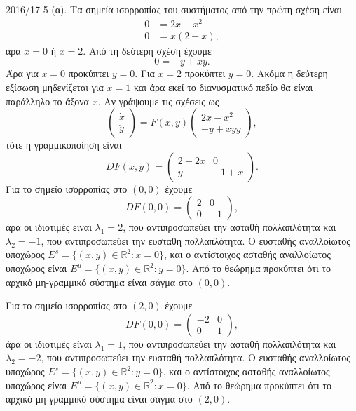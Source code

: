 \begin{solution}{2016/17 5}
    (α). Τα σημεία ισορροπίας του συστήματος από την πρώτη σχέση είναι
    \begin{align*}
        0 &= 2x - x^2 \\
        0 &= x(2- x),
    \end{align*}
    άρα \( x = 0 \) ή \( x = 2 \). Από τη δεύτερη σχέση έχουμε
    \[
        0 = -y + xy.
    \]
    Άρα για \( x = 0 \) προκύπτει \( y = 0 \). Για \( x = 2 \) προκύπτει \( y =
    0 \). Ακόμα η δεύτερη εξίσωση μηδενίζεται για \( x = 1 \) και άρα εκεί το
    διανυσματικό πεδίο θα είναι παράλληλο το άξονα \( x \). Αν γράψουμε τις
    σχέσεις ως
    \[
        \begin{pmatrix}
            \dot{x} \\
            \dot{y}
        \end{pmatrix} = F(x, y)
        \begin{pmatrix}
            2x - x^2 \\
            -y + xy
            \dot{y}
        \end{pmatrix},
    \]
    τότε η γραμμικοποίηση είναι
    \[
        DF(x, y) =
        \begin{pmatrix}
            2 - 2x & 0 \\
            y & -1 + x
        \end{pmatrix}.
    \]
    Για το σημείο ισορροπίας στο \( (0, 0) \) έχουμε
    \[
        DF(0, 0) =
        \begin{pmatrix}
            2 & 0 \\
            0 & -1
        \end{pmatrix},
    \]
    άρα οι ιδιοτιμές είναι \( \lambda_1 = 2 \), που αντιπροσωπεύει την ασταθή πολλαπλότητα
    και \( \lambda_2 = -1 \), που αντιπροσωπεύει την ευσταθή πολλαπλότητα. Ο ευσταθής
    αναλλοίωτος υποχώρος \( E^s = \{ (x, y)\in \mathbb{R}^2: x = 0 \} \), και ο αντίστοιχος
    ασταθής αναλλοίωτος υποχώρος είναι \( E^u = \{ (x, y)\in \mathbb{R}^2: y = 0 \} \).
    Από το θεώρημα  προκύπτει ότι το αρχικό μη-γραμμικό σύστημα είναι σάγμα
    στο \( (0, 0) \).

    Για το σημείο ισορροπίας στο \( (2, 0) \) έχουμε
    \[
        DF(0, 0) =
        \begin{pmatrix}
            -2 & 0 \\
            0 & 1
        \end{pmatrix},
    \]
    άρα οι ιδιοτιμές είναι \( \lambda_1 = 1 \), που αντιπροσωπεύει την ασταθή πολλαπλότητα
    και \( \lambda_2 = -2 \), που αντιπροσωπεύει την ευσταθή πολλαπλότητα. Ο ευσταθής
    αναλλοίωτος υποχώρος \( E^s = \{ (x, y)\in \mathbb{R}^2: y = 0 \} \), και ο αντίστοιχος
    ασταθής αναλλοίωτος υποχώρος είναι \( E^u = \{ (x, y)\in \mathbb{R}^2: x = 0 \} \).
    Από το θεώρημα  προκύπτει ότι το αρχικό μη-γραμμικό σύστημα είναι σάγμα
    στο \( (2, 0) \).


\end{solution}
